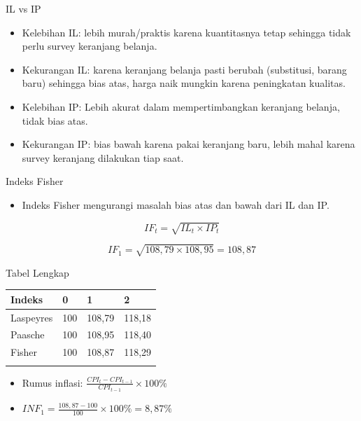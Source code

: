 \documentclass[
  ignorenonframetext,
]{beamer}
\providecommand{\tightlist}{%
  \setlength{\itemsep}{0pt}\setlength{\parskip}{0pt}}\usepackage{longtable,booktabs,array}
\begin{document}
\begin{frame}{IL vs IP}
\label{il-vs-ip}
\begin{itemize}
\item
  Kelebihan IL: lebih murah/praktis karena kuantitasnya tetap sehingga
  tidak perlu survey keranjang belanja.
\item
  Kekurangan IL: karena keranjang belanja pasti berubah (substitusi,
  barang baru) sehingga bias atas, harga naik mungkin karena peningkatan
  kualitas.
\item
  Kelebihan IP: Lebih akurat dalam mempertimbangkan keranjang belanja,
  tidak bias atas.
\item
  Kekurangan IP: bias bawah karena pakai keranjang baru, lebih mahal
  karena survey keranjang dilakukan tiap saat.
\end{itemize}
\end{frame}

\begin{frame}{Indeks Fisher}
\label{indeks-fisher}
\begin{itemize}
\tightlist
\item
  Indeks Fisher mengurangi masalah bias atas dan bawah dari IL dan IP.
\end{itemize}

\[
IF_t=\sqrt{IL_t \times IP_t}
\]

\[
IF_1=\sqrt{108,79\times 108,95}=108,87
\]
\end{frame}

\begin{frame}{Tabel Lengkap}
\label{tabel-lengkap}
\begin{longtable}[]{@{}llll@{}}
\toprule\noalign{}
Indeks & 0 & 1 & 2 \\
\midrule\noalign{}
\endhead
Laspeyres & 100 & 108,79 & 118,18 \\
Paasche & 100 & 108,95 & 118,40 \\
Fisher & 100 & 108,87 & 118,29 \\
\bottomrule\noalign{}
\end{longtable}

\begin{itemize}
\item
  Rumus inflasi: \(\frac{CPI_t-CPI_{t-1}}{CPI_{t-1}} \times 100\%\)
\item
  \(INF_1=\frac{108,87-100}{100}\times 100\%=8,87\%\)
\end{itemize}
\end{frame}
\end{document}
